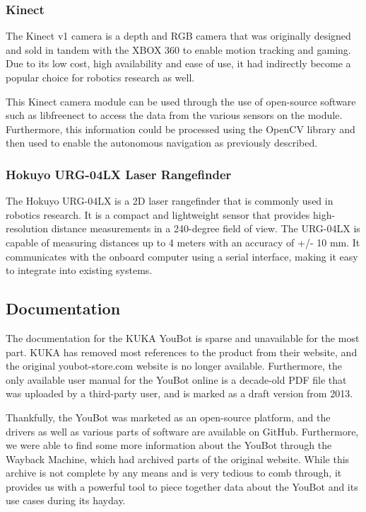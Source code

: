 \documentclass[a4paper, 12pt]{article}
\newif\ifshownotes
\newcommand{\notes}[1]{\ifshownotes\textcolor{blue}{#1}\fi}
\begin{document}
    \subsubsection{Kinect}  

    The Kinect v1 camera is a depth and RGB camera that was originally designed and sold in tandem with the XBOX 360 to enable motion tracking and gaming. Due to its low cost, high availability and ease of use, it had indirectly become a popular choice for robotics research as well.

    This Kinect camera module can be used through the use of open-source software such as libfreenect \notes{[cite]} to access the data from the various sensors on the module. Furthermore, this information could be processed using the OpenCV library and then used to enable the autonomous navigation as previously described. 

    \subsubsection{Hokuyo URG-04LX Laser Rangefinder}

    The Hokuyo URG-04LX is a 2D laser rangefinder that is commonly used in robotics research. It is a compact and lightweight sensor that provides high-resolution distance measurements in a 240-degree field of view. The URG-04LX is capable of measuring distances up to 4 meters with an accuracy of +/- 10 mm. It communicates with the onboard computer using a serial interface, making it easy to integrate into existing systems. 

    \subsection{Documentation}

    The documentation for the KUKA YouBot is sparse and unavailable for the most part. KUKA has removed most references to the product from their website, and the original youbot-store.com website is no longer available. Furthermore, the only available user manual for the YouBot online is a decade-old PDF file that was uploaded by a third-party user, and is marked as a draft version from 2013. 

    Thankfully, the YouBot was marketed as an open-source platform, and the drivers as well as various parts of software are available on GitHub. Furthermore, we were able to find some more information about the YouBot through the Wayback Machine, which had archived parts of the original website. While this archive is not complete by any means and is very tedious to comb through, it provides us with a powerful tool to piece together data about the YouBot and its use cases during its hayday.
\end{document}
